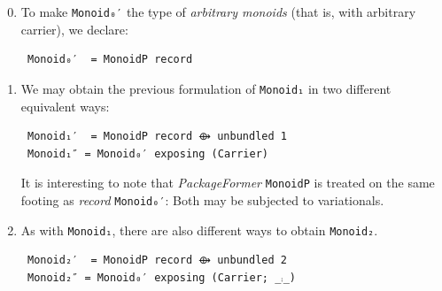 \documentclass[sigplan,screen]{acmart}
\begin{document}
\begin{enumerate}
\setcounter{enumi}{-1}
\item To make \texttt{Monoid₀′} the type of \emph{arbitrary monoids}
(that is, with arbitrary carrier), we declare:
\vspace{0.3em}
\begin{verbatim}
 Monoid₀′  = MonoidP record
\end{verbatim}

\setcounter{enumi}{0}
\item We may obtain the previous formulation of
\texttt{Monoid₁} in two different equivalent ways:
\vspace{0.3em}
\begin{verbatim}
 Monoid₁′  = MonoidP record ⟴ unbundled 1
 Monoid₁″ = Monoid₀′ exposing (Carrier)
\end{verbatim}

\vspace{0.3em}
It is interesting to note that \emph{\textsf{PackageFormer}} \texttt{MonoidP} is treated on
the same footing as \emph{record} \texttt{Monoid₀′}: Both may be subjected to variationals.
\end{enumerate}

\begin{enumerate}
\setcounter{enumi}{1}
\item As with \texttt{Monoid₁}, there are also different ways
to obtain \texttt{Monoid₂}.
\vspace{0.3em}
\begin{verbatim}
 Monoid₂′  = MonoidP record ⟴ unbundled 2
 Monoid₂″ = Monoid₀′ exposing (Carrier; _⨾_)
\end{verbatim}

\vspace{0.3em}
\end{enumerate}
\end{document}
